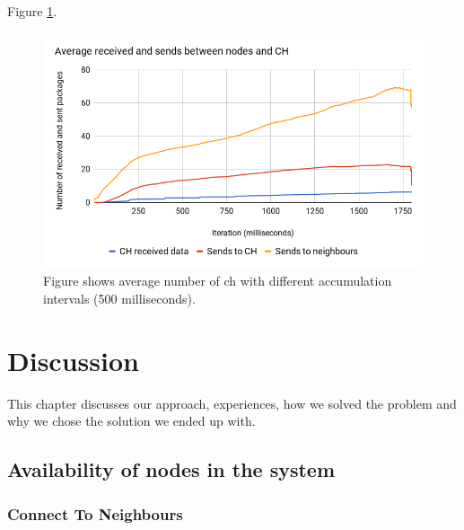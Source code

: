 \documentclass[USenglish]{uit-thesis}
\begin{document}
Figure \ref{fig:sentvsrecvChart}.

\begin{figure} [ht]
\centering
\includegraphics[width=\textwidth]{sentVsRecvChart.png}
\caption{Figure shows average number of \gls{ch} with different accumulation intervals (500 milliseconds).}
\label{fig:sentvsrecvChart}
\end{figure}




\chapter{Discussion}

This chapter discusses our approach, experiences, how we solved the problem and why we chose the solution we ended up with.

\section{Availability of nodes in the system}

\subsection{Connect To Neighbours} \label{disc:conn_neighbours}
\end{document}
